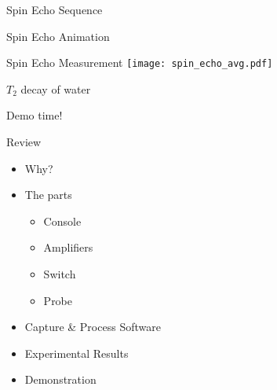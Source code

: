 \documentclass{ethpresentation}
\begin{document}
\begin{frame}{Spin Echo Sequence}
  \centering
  
\end{frame}

\begin{frame}{Spin Echo Animation}
  \begin{center}
  \end{center}
\end{frame}

\begin{frame}{Spin Echo Measurement}
  \centering
  \texttt{[image: spin\_echo\_avg.pdf]}
\end{frame}


\begin{frame}{\(T_2\) decay of water}
  \centering
\end{frame}

\begin{frame}[standout]
  Demo time!
\end{frame}

\begin{frame}{Review}
  \begin{itemize}
    \item Why?
    \item The parts%
          \begin{itemize}
            \item Console
            \item Amplifiers
            \item Switch
            \item Probe
          \end{itemize}
    \item Capture \& Process Software
    \item Experimental Results
    \item Demonstration
  \end{itemize}
\end{frame}
\end{document}
